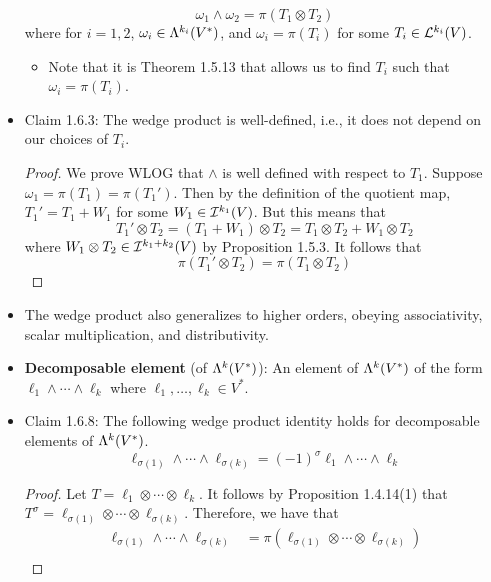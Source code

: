 \documentclass[../notes.tex]{subfiles}
\begin{document}
\begin{itemize}
    \begin{equation*}
        \omega_1\wedge\omega_2 = \pi(T_1\otimes T_2)
    \end{equation*}
    where for $i=1,2$, $\omega_i\in\lam[k_i]{V^*}$, and $\omega_i=\pi(T_i)$ for some $T_i\in\lin[k_i]{V}$.
    \begin{itemize}
        \item Note that it is Theorem 1.5.13 that allows us to find $T_i$ such that $\omega_i=\pi(T_i)$.
    \end{itemize}
    \item Claim 1.6.3: The wedge product is well-defined, i.e., it does not depend on our choices of $T_i$.
    \begin{proof}
        We prove WLOG that $\wedge$ is well defined with respect to $T_1$. Suppose $\omega_1=\pi(T_1)=\pi(T_1')$. Then by the definition of the quotient map, $T_1'=T_1+W_1$ for some $W_1\in\ide[k_1]{V}$. But this means that
        \begin{equation*}
            T_1'\otimes T_2 = (T_1+W_1)\otimes T_2
            = T_1\otimes T_2+W_1\otimes T_2
        \end{equation*}
        where $W_1\otimes T_2\in\ide[k_1+k_2]{V}$ by Proposition 1.5.3. It follows that
        \begin{equation*}
            \pi(T_1'\otimes T_2) = \pi(T_1\otimes T_2)
        \end{equation*}
    \end{proof}
    \item The wedge product also generalizes to higher orders, obeying associativity, scalar multiplication, and distributivity.
    \item \textbf{Decomposable element} (of $\lam[k]{V^*}$): An element of $\lam[k]{V^*}$ of the form $\ell_1\wedge\cdots\wedge\ell_k$ where $\ell_1,\dots,\ell_k\in V^*$.
    \item Claim 1.6.8: The following wedge product identity holds for decomposable elements of $\lam[k]{V^*}$.
    \begin{equation*}
        \ell_{\sigma(1)}\wedge\cdots\wedge\ell_{\sigma(k)} = (-1)^\sigma\ell_1\wedge\cdots\wedge\ell_k
    \end{equation*}
    \begin{proof}
        Let $T=\ell_1\otimes\cdots\otimes\ell_k$. It follows by Proposition 1.4.14(1) that $T^\sigma=\ell_{\sigma(1)}\otimes\cdots\otimes\ell_{\sigma(k)}$. Therefore, we have that
        \begin{align*}
            \ell_{\sigma(1)}\wedge\cdots\wedge\ell_{\sigma(k)} &= \pi(\ell_{\sigma(1)}\otimes\cdots\otimes\ell_{\sigma(k)})\\

\end{align*}
\end{proof}
\end{itemize}
\end{document}
